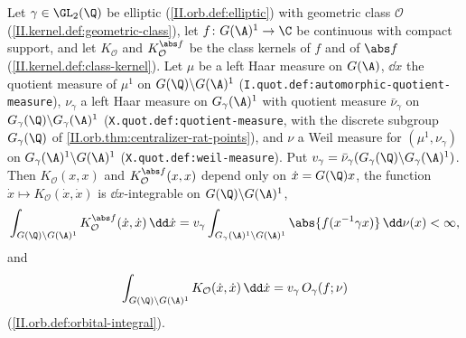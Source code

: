 Let $\gamma\in\GL_2(\Q)$ be elliptic (\cref{II.orb.def:elliptic}) with geometric class $\mathcal O$ (\cref{II.kernel.def:geometric-class}), let
$f\colon G(\A)^1\to\C$ be continuous with compact support, and let $K_{\mathcal O}$ and $K^{\abs f}_{\mathcal O}$ be the class kernels of $f$ and of $\abs f$
(\cref{II.kernel.def:class-kernel}). Let $\mu$ be a left Haar measure on $G(\A)$, $\dd\dot x$ the quotient measure of $\mu^1$ on $G(\Q)\backslash G(\A)^1$
(\texttt{I.quot.def:automorphic-quotient-measure}), $\nu_\gamma$ a left Haar measure on $G_\gamma(\A)^1$ with quotient measure $\bar\nu_\gamma$ on
$G_\gamma(\Q)\backslash G_\gamma(\A)^1$ (\texttt{X.quot.def:quotient-measure}, with the discrete subgroup $G_\gamma(\Q)$ of \cref{II.orb.thm:centralizer-rat-points}), and
$\nu$ a Weil measure for $(\mu^1,\nu_\gamma)$ on $G_\gamma(\A)^1\backslash G(\A)^1$ (\texttt{X.quot.def:weil-measure}). Put
$v_\gamma=\bar\nu_\gamma(G_\gamma(\Q)\backslash G_\gamma(\A)^1)$. Then $K_{\mathcal O}(x,x)$ and $K^{\abs f}_{\mathcal O}(x,x)$ depend only on $\dot x=G(\Q)x$, the function
$\dot x\mapsto K_{\mathcal O}(\dot x,\dot x)$ is $\dd\dot x$-integrable on $G(\Q)\backslash G(\A)^1$,
\[
  \int_{G(\Q)\backslash G(\A)^1}K^{\abs f}_{\mathcal O}(\dot x,\dot x)\,\dd\dot x=v_\gamma\int_{G_\gamma(\A)^1\backslash G(\A)^1}\abs{f(x^{-1}\gamma x)}\,\dd\nu(x)<\infty,
\]
and
\[
  \int_{G(\Q)\backslash G(\A)^1}K_{\mathcal O}(\dot x,\dot x)\,\dd\dot x=v_\gamma\,O_\gamma(f;\nu)
\]
(\cref{II.orb.def:orbital-integral}).
